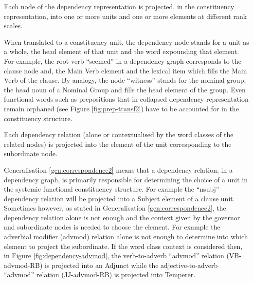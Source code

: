     \begin{generalization}\label{gen:correspondence1} %
     Each node of the dependency representation is projected, in the constituency representation, into one or more units and one or more elements at different rank scales.
    \end{generalization}

    When translated to a constituency unit, the dependency node stands for a unit as a whole, the head element of that unit and the word expounding that element. For example, the root verb ``seemed'' in a dependency graph corresponds to the clause node and, the Main Verb element and the lexical item which fills the Main Verb of the clause. By analogy, the node ``witness'' stands for the nominal group, the head noun of a Nominal Group and fills the head element of the group. Even functional words such as prepositions that in collapsed dependency representation remain orphaned (see Figure \ref{fig:prep-transf2}) have to be accounted for in the constituency structure. 

    \begin{generalization}\label{gen:correspondence2}
        Each dependency relation (alone or contextualised by the word classes of the related nodes) is projected into the element of the unit corresponding to the subordinate node. 
    \end{generalization}

    Generalisation \ref{gen:correspondence2} means that a dependency relation, in a dependency graph, is primarily responsible for determining the choice of a unit in the systemic functional constituency structure. For example the ``nsubj'' dependency relation will be projected into a Subject element of a clause unit. Sometimes however, as stated in Generalisation \ref{gen:correspondence2}, the dependency relation alone is not enough and the context given by the governor and subordinate nodes is needed to choose the element. For example the adverbial modifier (advmod) relation alone is not enough to determine into which element to project the subordinate. If the word class context is considered then, in Figure \ref{fig:dependency-advmod}, the verb-to-adverb ``advmod'' relation (VB-advmod-RB) is projected into an Adjunct while the adjective-to-adverb ``advmod'' relation (JJ-advmod-RB) is projected into Temperer.

